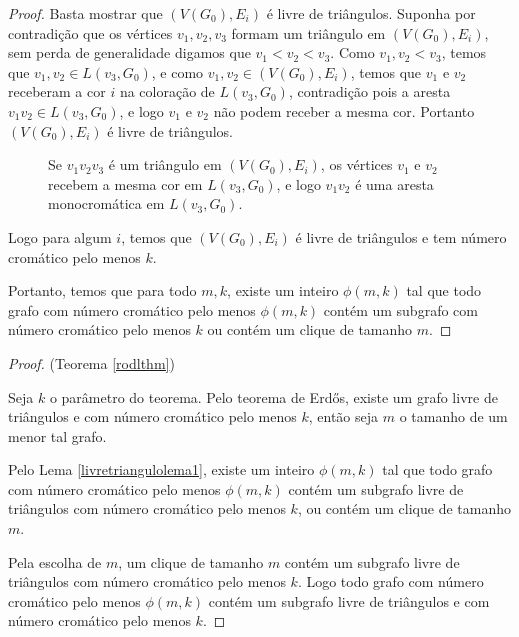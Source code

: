 \begin{proof}
Basta mostrar que $(V(G_0),E_i)$ é livre de triângulos. Suponha por contradição que os vértices $v_1,v_2,v_3$ formam um triângulo em $(V(G_0),E_i)$, sem perda de generalidade digamos que $v_1 < v_2 < v_3$. Como $v_1,v_2 < v_3$, temos que $v_1,v_2\in L(v_3, G_0)$, e como $v_1,v_2 \in (V(G_0),E_i)$, temos que $v_1$ e $v_2$ receberam a cor $i$ na coloração de $L(v_3, G_0)$, contradição pois a aresta $v_1v_2 \in L(v_3, G_0)$, e logo $v_1$ e $v_2$ não podem receber a mesma cor. Portanto $(V(G_0),E_i)$ é livre de triângulos.

\begin{figure}[H]
\centering
{}
\caption{Se $v_1v_2v_3$ é um triângulo em $(V(G_0),E_i)$, os vértices $v_1$ e $v_2$ recebem a mesma cor em $L(v_3, G_0)$, e logo $v_1v_2$ é uma aresta monocromática em $L(v_3, G_0)$.}
\label{fig:trianglefree-trianglefree}
\end{figure}

Logo para algum $i$, temos que $(V(G_0), E_i)$ é livre de triângulos e tem número cromático pelo menos $k$.

Portanto, temos que para todo $m,k$, existe um inteiro $\phi(m,k)$ tal que todo grafo com número cromático pelo menos $\phi(m,k)$ contém um subgrafo com número cromático pelo menos $k$ ou contém um clique de tamanho $m$.
\end{proof}

\begin{proof}{(Teorema \ref{rodlthm})}

Seja $k$ o parâmetro do teorema. Pelo teorema de Erd\H{o}s, existe um grafo livre de triângulos e com número cromático pelo menos $k$, então seja $m$ o tamanho de um menor tal grafo.

Pelo Lema \ref{livretriangulolema1}, existe um inteiro $\phi(m,k)$ tal que todo grafo com número cromático pelo menos $\phi(m,k)$ contém um subgrafo livre de triângulos com número cromático pelo menos $k$, ou contém um clique de tamanho $m$.

Pela escolha de $m$, um clique de tamanho $m$ contém um subgrafo livre de triângulos com número cromático pelo menos $k$. Logo todo grafo com número cromático pelo menos $\phi(m,k)$ contém um subgrafo livre de triângulos e com número cromático pelo menos $k$.

\end{proof}

